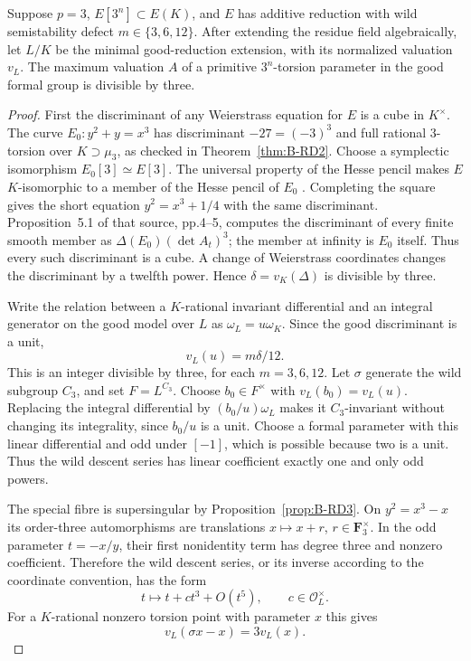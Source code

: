 \begin{lemma}
\label{lem:B-RD20-wild}
Suppose $p=3$, $E[3^n]\subset E(K)$, and $E$ has additive reduction
with wild semistability defect $m\in\{3,6,12\}$.
After extending the residue field algebraically, let $L/K$ be the
minimal good-reduction extension, with its normalized valuation
$v_L$. The maximum valuation $A$ of a primitive $3^n$-torsion
parameter in the good formal group is divisible by three.
\end{lemma}
\begin{proof}
First the discriminant of any Weierstrass equation for $E$ is a
cube in $K^\times$. The curve $E_0:y^2+y=x^3$ has discriminant
$-27=(-3)^3$ and full rational $3$-torsion over $K\supset\mu_3$,
as checked in Theorem~\ref{thm:B-RD2}. Choose a symplectic
isomorphism $E_0[3]\simeq E[3]$. The universal property of the
Hesse pencil makes $E$ $K$-isomorphic to a member of the Hesse
pencil of $E_0$ \cite[Theorem~1.1, p.2; proof, pp.7--8]
{AnemaTopTuijp2018Hesse}. Completing the square gives the short
equation $y^2=x^3+1/4$ with the same discriminant. Proposition~5.1
of that source, pp.4--5, computes the discriminant of every finite
smooth member as $\Delta(E_0)(\det A_t)^3$; the member at infinity
is $E_0$ itself. Thus every such discriminant is a cube.
A change of Weierstrass coordinates changes the discriminant by a
twelfth power. Hence $\delta=v_K(\Delta)$ is divisible by three.

Write the relation between a $K$-rational invariant differential and
an integral generator on the good model over $L$ as
$\omega_L=u\omega_K$. Since the good discriminant is a unit,
\[
                  v_L(u)=m\delta/12.
\]
This is an integer divisible by three, for each
$m=3,6,12$. Let $\sigma$ generate the wild subgroup $C_3$, and set
$F=L^{C_3}$. Choose $b_0\in F^\times$ with
$v_L(b_0)=v_L(u)$. Replacing the integral differential by
$(b_0/u)\omega_L$ makes it $C_3$-invariant without changing its
integrality, since $b_0/u$ is a unit. Choose a formal parameter with
this linear differential and odd under $[-1]$, which is possible
because two is a unit. Thus the wild descent series has linear
coefficient exactly one and only odd powers.

The special fibre is supersingular by Proposition~\ref{prop:B-RD3}.
On $y^2=x^3-x$ its order-three automorphisms are translations
$x\mapsto x+r$, $r\in\mathbf F_3^\times$. In the odd parameter
$t=-x/y$, their first nonidentity term has degree three and nonzero
coefficient. Therefore the wild descent series, or its inverse
according to the coordinate convention, has the form
\[
                   t\longmapsto t+c t^3+O(t^5),
                   \qquad c\in\mathcal O_L^\times.
\]
For a $K$-rational nonzero torsion point with parameter $x$ this gives
\[
                     v_L(\sigma x-x)=3v_L(x).       \tag{B-RD20.1}
\]


\end{proof}
